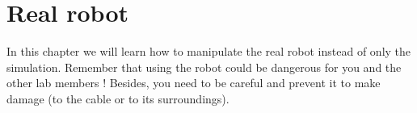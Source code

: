 \chapter{Real robot}

In this chapter we will learn how to manipulate the real robot instead of only the simulation. Remember that using the robot could be dangerous for you and the other lab members ! Besides, you need to be careful and prevent it to make damage (to the cable or to its surroundings).